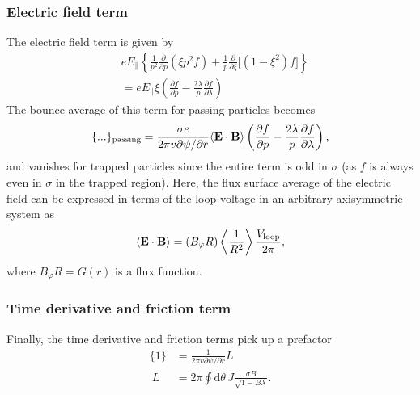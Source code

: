 \documentclass[11pt,a4paper]{article}
\newcommand{\rd}{\ensuremath{\mathrm{d}}}
\newcommand{\sub}[1]{\ensuremath{_{\text{#1}}}}
\renewcommand{\b}[1]{\ensuremath{ {\bf #1 } }}
\begin{document}
\subsubsection*{Electric field term}
The electric field term is given by
\begin{align}
&eE_\parallel \left\{\frac{1}{p^2}\frac{\partial}{\partial p}(\xi p^2 f) + \frac{1}{p}\frac{\partial}{\partial \xi}\Big[(1-\xi^2) f\Big] \right\} \nonumber \\
&= eE_\parallel \xi\left(\frac{\partial  f}{\partial p} - \frac{2\lambda}{p}\frac{\partial f}{\partial \lambda} \right)
\end{align}
The bounce average of this term for passing particles becomes
\begin{align}
\{...\}\sub{passing} = \frac{\sigma e}{2\pi v \partial \psi/\partial r} \langle \b{E}\cdot\b{B}\rangle \left(\frac{\partial  f}{\partial p} - \frac{2\lambda}{p}\frac{\partial f}{\partial \lambda} \right),
\end{align}
and vanishes for trapped particles since the entire term is odd in $\sigma$ (as $f$ is always even in $\sigma$ in the trapped region). Here, the flux surface average of the electric field can be expressed in terms of the loop voltage in an arbitrary axisymmetric system as
\begin{align}
\langle \b{E}\cdot\b{B} \rangle = (B_\varphi R) \left\langle\frac{1}{R^2}\right\rangle \frac{V\sub{loop}}{2\pi},
\end{align}
where $B_\varphi R = G(r)$ is a flux function.

\subsubsection*{Time derivative and friction term}
Finally, the time derivative and friction terms pick up a prefactor
\begin{align}
\{1\} &= \frac{1}{2\pi v \partial \psi/\partial r} L \nonumber \\\
L &= 2\pi \oint \rd\theta \, J\frac{\sigma B}{\sqrt{1-B\lambda}}.
\end{align}
\end{document}
